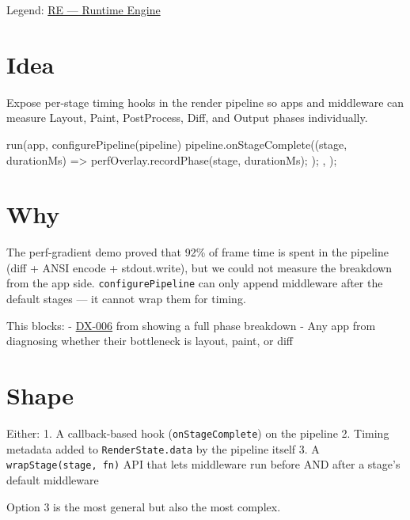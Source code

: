 Legend: \href{https://github.com/flyingrobots/bijou/blob/1853ad902f6bf219326409e7f743a5a1d6517dbc/docs/legends/RE-runtime-engine.md}{RE --- Runtime Engine}

\section{Idea}\label{record-398-idea}

Expose per-stage timing hooks in the render pipeline so apps and middleware can measure Layout, Paint, PostProcess, Diff, and Output phases individually.

\begin{CodeBlock}
run(app, {
  configurePipeline(pipeline) {
    pipeline.onStageComplete((stage, durationMs) => {
      perfOverlay.recordPhase(stage, durationMs);
    });
  },
});
\end{CodeBlock}

\section{Why}\label{record-398-why}

The perf-gradient demo proved that 92\% of frame time is spent in the pipeline (diff + ANSI encode + stdout.write), but we could not measure the breakdown from the app side. \texttt{c\allowbreak{}o\allowbreak{}n\allowbreak{}f\allowbreak{}i\allowbreak{}g\allowbreak{}u\allowbreak{}r\allowbreak{}e\allowbreak{}P\allowbreak{}i\allowbreak{}p\allowbreak{}e\allowbreak{}l\allowbreak{}i\allowbreak{}n\allowbreak{}e} can only append middleware after the default stages --- it cannot wrap them for timing.

This blocks: - \href{https://github.com/flyingrobots/bijou/blob/cbd70612140e7a450d764b3c7be1c6af878b99bc/docs/retro/DX_006-debug-performance-overlay-component.md}{DX-006} from showing a full phase breakdown - Any app from diagnosing whether their bottleneck is layout, paint, or diff

\section{Shape}\label{record-398-shape}

Either: 1. A callback-based hook (\texttt{o\allowbreak{}n\allowbreak{}S\allowbreak{}t\allowbreak{}a\allowbreak{}g\allowbreak{}e\allowbreak{}C\allowbreak{}o\allowbreak{}m\allowbreak{}p\allowbreak{}l\allowbreak{}e\allowbreak{}t\allowbreak{}e}) on the pipeline 2. Timing metadata added to \texttt{R\allowbreak{}e\allowbreak{}n\allowbreak{}d\allowbreak{}e\allowbreak{}r\allowbreak{}S\allowbreak{}t\allowbreak{}a\allowbreak{}t\allowbreak{}e\allowbreak{}.\allowbreak{}d\allowbreak{}a\allowbreak{}t\allowbreak{}a} by the pipeline itself 3. A \texttt{w\allowbreak{}r\allowbreak{}a\allowbreak{}p\allowbreak{}S\allowbreak{}t\allowbreak{}a\allowbreak{}g\allowbreak{}e\allowbreak{}(\allowbreak{}s\allowbreak{}t\allowbreak{}a\allowbreak{}g\allowbreak{}e\allowbreak{},\allowbreak{} \allowbreak{}f\allowbreak{}n\allowbreak{})} API that lets middleware run before AND after a stage's default middleware

Option 3 is the most general but also the most complex.

